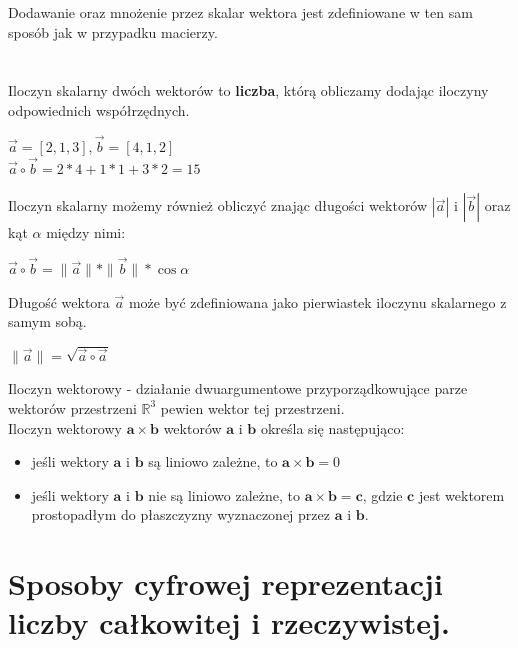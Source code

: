 \documentclass[a4paper,12pt,oneside]{book}
\begin{document}
			Dodawanie oraz mnożenie przez skalar wektora jest zdefiniowane w ten sam sposób jak w przypadku macierzy. \\\\\\
			
			
			Iloczyn skalarny dwóch wektorów to \textbf{liczba}, którą obliczamy dodając iloczyny odpowiednich współrzędnych.
			
			\begin{center}
				$\vec{a}=[2,1,3], \vec{b}=[4,1,2]$\\
				$\vec{a}\circ\vec{b} = 2*4 + 1*1 + 3*2 = 15$
			\end{center}
		
			Iloczyn skalarny możemy również obliczyć znając długości wektorów $|\vec{a}|$ i $|\vec{b}|$ oraz kąt $\alpha$ między nimi:
			
			\begin{center}
				$\vec{a}\circ\vec{b}=\|\vec{a}\|*\|\vec{b}\|*\cos\alpha$
			\end{center}
		
			Długość wektora $\vec{a}$ może być zdefiniowana jako pierwiastek iloczynu skalarnego z samym sobą. 
			
			\begin{center}
				$\|\vec{a}\|=\sqrt{\vec{a}\circ\vec{a}}$
			\end{center}
		
		Iloczyn wektorowy - działanie dwuargumentowe przyporządkowujące parze wektorów przestrzeni $\mathbb{R}^3$ pewien wektor tej przestrzeni.\\
		
		Iloczyn wektorowy $\mathbf {a} \times \mathbf {b}$ wektorów $\mathbf a $ i $ \mathbf  b$ określa się następująco:
		\begin{itemize}
			\item jeśli wektory $\mathbf{a}$ i $\mathbf{b}$ są liniowo zależne, to $\mathbf{a}\times\mathbf{b}=0$
			\item jeśli wektory $\mathbf{a}$ i $\mathbf{b}$ nie są liniowo zależne, to $\mathbf{a}\times\mathbf{b}=\mathbf{c}$, gdzie $\mathbf{c}$ jest wektorem prostopadłym do płaszczyzny wyznaczonej przez $\mathbf{a}$ i $\mathbf{b}$.
		\end{itemize}
		
		\setcounter{section}{5}
		\section{Sposoby cyfrowej reprezentacji liczby całkowitej i rzeczywistej.}
				
\end{document}
